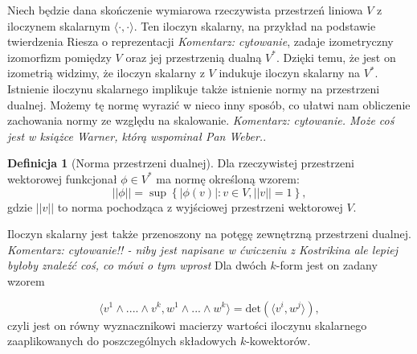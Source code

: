 \documentclass[licencjacka]{pracamgr}
\theoremstyle{definition}
\newtheorem{definition}{Definicja}[section]
\theoremstyle{definition}
\theoremstyle{plain}
\theoremstyle{plain}
\theoremstyle{plain}
\theoremstyle{plain}
\begin{document}
Niech będzie dana skończenie wymiarowa rzeczywista przestrzeń liniowa $V$ z
iloczynem skalarnym $\langle \cdot, \cdot \rangle$.
Ten iloczyn skalarny, na przykład na podstawie twierdzenia Riesza o
reprezentacji \emph{Komentarz: cytowanie}, zadaje izometryczny izomorfizm
pomiędzy $V$ oraz jej przestrzenią dualną $V^\ast$. 
Dzięki temu, że jest on izometrią widzimy, że iloczyn skalarny z $V$
indukuje iloczyn skalarny na $V^\ast$.  Istnienie iloczynu skalarnego
implikuje także istnienie normy na przestrzeni dualnej. Możemy tę
normę wyrazić w nieco inny sposób, co ułatwi nam obliczenie zachowania
normy ze względu na skalowanie.  \emph{Komentarz: cytowanie. Może coś
  jest w książce Warner, którą wspominał Pan Weber.}. \\

\begin{definition}[Norma przestrzeni dualnej]
Dla rzeczywistej przestrzeni wektorowej funkcjonał $\phi \in V^\ast$ ma
normę określoną wzorem:
\begin{equation}\label{norm-of-functional}
||\phi|| = \sup \left\{ |\phi(v)|: v \in V, ||v|| = 1 \right\},
\end{equation}
gdzie $||v||$ to norma pochodząca z wyjściowej przestrzeni wektorowej $V$.  \\
\end{definition}

Iloczyn skalarny jest także przenoszony na potęgę zewnętrzną przestrzeni
dualnej. \emph{Komentarz: cytowanie!! - niby jest napisane w ćwiczeniu z
Kostrikina ale lepiej byłoby znaleźć coś, co mówi o tym wprost} Dla dwóch
$k$-form jest on zadany wzorem

\begin{equation} \langle v^1 \wedge ....\wedge v^k, w^1 \wedge ... \wedge w^k
\rangle = \text{det} \left( \langle v^i, w^j \rangle \right), 
\end{equation}
czyli jest on równy wyznacznikowi macierzy wartości iloczynu skalarnego
zaaplikowanych do poszczególnych składowych $k$-kowektorów.  \\
\end{document}
